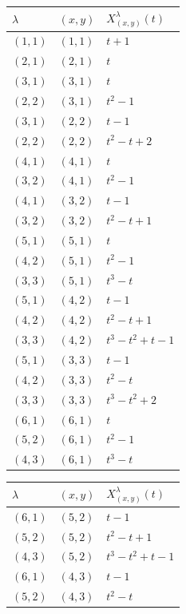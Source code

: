 \documentclass[10pt]{article}
\begin{document}
\smallskip
{\small
\begin{minipage}[t]{0.48\textwidth}\centering
\begin{tabular}{@{}lll@{}}
\toprule $\lambda$ & $(x,y)$ & $X^\lambda_{(x,y)}(t)$\\ \midrule
$(1,1)$ & $(1,1)$ & $t + 1$ \\
$(2,1)$ & $(2,1)$ & $t$ \\
$(3,1)$ & $(3,1)$ & $t$ \\
$(2,2)$ & $(3,1)$ & $t^{2} - 1$ \\
$(3,1)$ & $(2,2)$ & $t - 1$ \\
$(2,2)$ & $(2,2)$ & $t^{2} - t + 2$ \\
$(4,1)$ & $(4,1)$ & $t$ \\
$(3,2)$ & $(4,1)$ & $t^{2} - 1$ \\
$(4,1)$ & $(3,2)$ & $t - 1$ \\
$(3,2)$ & $(3,2)$ & $t^{2} - t + 1$ \\
$(5,1)$ & $(5,1)$ & $t$ \\
$(4,2)$ & $(5,1)$ & $t^{2} - 1$ \\
$(3,3)$ & $(5,1)$ & $t^{3} - t$ \\
$(5,1)$ & $(4,2)$ & $t - 1$ \\
$(4,2)$ & $(4,2)$ & $t^{2} - t + 1$ \\
$(3,3)$ & $(4,2)$ & $t^{3} - t^{2} + t - 1$ \\
$(5,1)$ & $(3,3)$ & $t - 1$ \\
$(4,2)$ & $(3,3)$ & $t^{2} - t$ \\
$(3,3)$ & $(3,3)$ & $t^{3} - t^{2} + 2$ \\
$(6,1)$ & $(6,1)$ & $t$ \\
$(5,2)$ & $(6,1)$ & $t^{2} - 1$ \\
$(4,3)$ & $(6,1)$ & $t^{3} - t$ \\
\bottomrule
\end{tabular}
\end{minipage}\hfill
\begin{minipage}[t]{0.48\textwidth}\centering
\begin{tabular}{@{}lll@{}}
\toprule $\lambda$ & $(x,y)$ & $X^\lambda_{(x,y)}(t)$\\ \midrule
$(6,1)$ & $(5,2)$ & $t - 1$ \\
$(5,2)$ & $(5,2)$ & $t^{2} - t + 1$ \\
$(4,3)$ & $(5,2)$ & $t^{3} - t^{2} + t - 1$ \\
$(6,1)$ & $(4,3)$ & $t - 1$ \\
$(5,2)$ & $(4,3)$ & $t^{2} - t$ \\

\end{tabular}
\end{minipage}}
\end{document}

